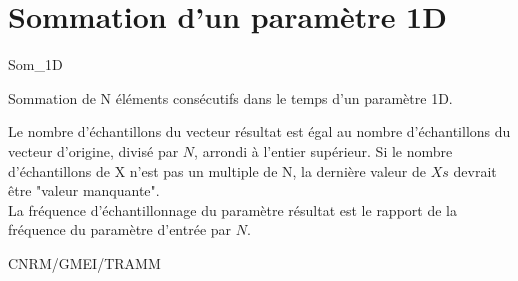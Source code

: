%
\section{Sommation d'un param\`etre 1D}

 {\sf Som\_1D}

Sommation de N \'el\'ements cons\'ecutifs 
dans le temps d'un param\`etre 1D.


\bigskip






Le nombre d'\'echantillons du vecteur r\'esultat est \'egal au nombre
d'\'echantillons du vecteur d'origine, divis\'e par  $N$, arrondi \`a
l'entier sup\'erieur.
Si le nombre d'\'echantillons de X n'est pas un multiple de N, la
derni\`ere valeur de $Xs$ devrait \^etre "valeur manquante".\\
La fr\'equence d'\'echantillonnage du param\`etre r\'esultat est le rapport de
la fr\'equence du param\`etre d'entr\'ee par $N$.

CNRM/GMEI/TRAMM

